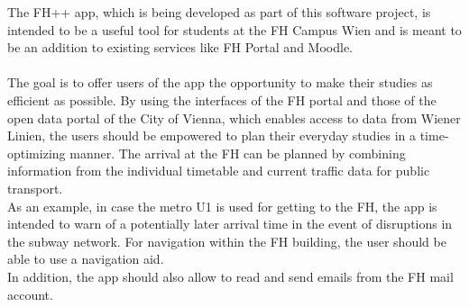 \documentclass{scrreprt}
\begin{document}
	The FH++ app, which is being developed as part of this software project, is intended to be a useful tool for students at the FH Campus Wien and is meant to be an addition to existing services like FH Portal and Moodle. \\ \\
	The goal is to offer users of the app the opportunity to make their studies as efficient as possible.
	By using the interfaces of the FH portal and those of the open data portal of the City of Vienna, which enables access to data from Wiener Linien,
	the users should be empowered to plan their everyday studies in a time-optimizing manner.
	The arrival at the FH can be planned by combining information from the individual timetable and current traffic data for public transport. \\
	As an example, in case the metro U1 is used for getting to the FH, the app is intended to warn of a potentially later arrival time in the event of disruptions in the subway network.
	For navigation within the FH building, the user should be able to use a navigation aid. \\
	In addition, the app should also allow to read and send emails from the FH mail account.
	
	
\end{document}
